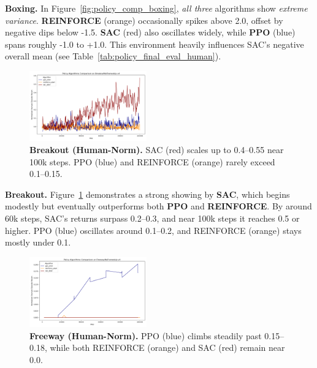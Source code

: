 \noindent
\textbf{Boxing.} In Figure~\ref{fig:policy_comp_boxing}, \emph{all three} algorithms show \emph{extreme variance}. \textbf{REINFORCE} (orange) occasionally spikes above 2.0, offset by negative dips below -1.5. \textbf{SAC} (red) also oscillates widely, while \textbf{PPO} (blue) spans roughly -1.0 to +1.0. This environment heavily influences SAC’s negative overall mean (see Table~\ref{tab:policy_final_eval_human}).

\begin{figure}[htbp]
	\centering
	\includegraphics[width=0.45\textwidth]{figures/policy_comparison/charts_episodic_return_human_comparison_BreakoutNoFrameskip-v4_policy.png}
	\caption{\textbf{Breakout (Human-Norm).} SAC (red) scales up to 0.4--0.55 near 100k steps. PPO (blue) and REINFORCE (orange) rarely exceed 0.1--0.15.}
	\label{fig:policy_comp_breakout}
\end{figure}

\noindent
\textbf{Breakout.} Figure~\ref{fig:policy_comp_breakout} demonstrates a strong showing by \textbf{SAC}, which begins modestly but eventually outperforms both \textbf{PPO} and \textbf{REINFORCE}. By around 60k steps, SAC’s returns surpass 0.2--0.3, and near 100k steps it reaches 0.5 or higher. PPO (blue) oscillates around 0.1--0.2, and REINFORCE (orange) stays mostly under 0.1.

\begin{figure}[htbp]
	\centering
	\includegraphics[width=0.45\textwidth]{figures/policy_comparison/charts_episodic_return_human_comparison_FreewayNoFrameskip-v4_policy.png}
	\caption{\textbf{Freeway (Human-Norm).} PPO (blue) climbs steadily past 0.15--0.18, while both REINFORCE (orange) and SAC (red) remain near 0.0.}
	\label{fig:policy_comp_freeway}
\end{figure}

